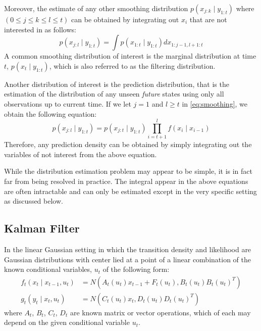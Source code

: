 Moreover, the estimate of any other smoothing distribution $p(x_{j:k} \mid y_{1:t})$ where $(0 \leq 	j \leq k \leq l \leq t)$ can be obtained by integrating out $x_i$ that are not interested in as follows:
\begin{equation}
  p(x_{j:l} \mid y_{1:t}) = \int p(x_{1:t} \mid y_{1:t}) dx_{1:j-1, l+1:t}
\label{eq:smoothing}
\end{equation}
A common smoothing distribution of interest is the marginal distribution at time $t$, $p(x_t \mid y_{1:t})$, which is also referred to as the filtering distribution.

Another distribution of interest is  the prediction distribution, that is the estimation of the distribution of any unseen \emph{future} states using only all observations up to current time. If we let $j = 1$ and $l \geq t$ in \eqref{eq:smoothing}, we obtain the following equation:
\begin{equation}
  p(x_{j:l} \mid y_{1:t}) = p(x_{j:t} \mid y_{1:t}) \prod^l_{i=t+1} f(x_i \mid x_{i-1})
\end{equation}
Therefore, any prediction density can be obtained by simply integrating out the variables of not interest from the above equation.

While the distribution estimation problem may appear to be simple, it is in fact far from being resolved in practice. The integral appear in the above equations are often intractable and can only be estimated except in the very specific setting as discussed below.

\subsection{Kalman Filter}
In the linear Gaussian setting in which the transition density and likelihood are Gaussian distributions with center lied at a point of a linear combination of the known conditional variables, $u_t$ of the following form:
\begin{align}
  f_t(x_t \mid x_{t-1}, u_t) &= N(A_t(u_t) x_{t-1} + F_t(u_t), B_t(u_t)B_t(u_t)^T) \nonumber \\
  g_t(y_t \mid x_t, u_t)    &= N(C_t(u_t) x_t, D_t(u_t)D_t(u_t)^T)
\end{align}
where $A_t$, $B_t$, $C_t$, $D_t$ are known matrix or vector operations, which of each may depend on the given conditional variable $u_t$.

